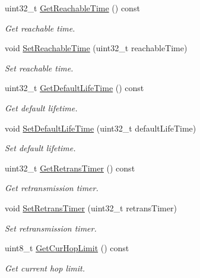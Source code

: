 \begin{DoxyCompactItemize}
uint32\+\_\+t \hyperlink{classns3_1_1RadvdInterface_a8fceef5abf2830e7017ff73b3d28748d}{Get\+Reachable\+Time} () const 
\begin{DoxyCompactList}\small\item\em Get reachable time. \end{DoxyCompactList}\item 
void \hyperlink{classns3_1_1RadvdInterface_afc87b9b3d54b574f31ab47b770ba0921}{Set\+Reachable\+Time} (uint32\+\_\+t reachable\+Time)
\begin{DoxyCompactList}\small\item\em Set reachable time. \end{DoxyCompactList}\item 
uint32\+\_\+t \hyperlink{classns3_1_1RadvdInterface_a0a3ff4d7459c8c9348913b0a90588050}{Get\+Default\+Life\+Time} () const 
\begin{DoxyCompactList}\small\item\em Get default lifetime. \end{DoxyCompactList}\item 
void \hyperlink{classns3_1_1RadvdInterface_a4d3cd73b547b28436aa0493361b74490}{Set\+Default\+Life\+Time} (uint32\+\_\+t default\+Life\+Time)
\begin{DoxyCompactList}\small\item\em Set default lifetime. \end{DoxyCompactList}\item 
uint32\+\_\+t \hyperlink{classns3_1_1RadvdInterface_a7c26f7108939d600f4cdbdd948202d09}{Get\+Retrans\+Timer} () const 
\begin{DoxyCompactList}\small\item\em Get retransmission timer. \end{DoxyCompactList}\item 
void \hyperlink{classns3_1_1RadvdInterface_aa1fbb8c2e485c3c372643948200a7761}{Set\+Retrans\+Timer} (uint32\+\_\+t retrans\+Timer)
\begin{DoxyCompactList}\small\item\em Set retransmission timer. \end{DoxyCompactList}\item 
uint8\+\_\+t \hyperlink{classns3_1_1RadvdInterface_aa07e72c8229980d6988b6e0d30145fe5}{Get\+Cur\+Hop\+Limit} () const 
\begin{DoxyCompactList}\small\item\em Get current hop limit. \end{DoxyCompactList}\item 

\end{DoxyCompactItemize}
